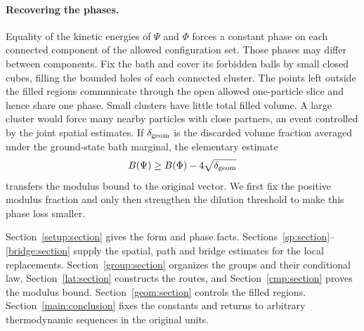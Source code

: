 \paragraph{Recovering the phases.}
Equality of the kinetic energies of $\Psi$ and $\Phi$ forces a constant
phase on each connected component of the allowed configuration set.
Those phases may differ between components. Fix the bath and cover its
forbidden balls by small closed cubes, filling the bounded holes of each
connected cluster. The points left outside the filled regions communicate
through the open allowed one-particle slice and hence share one phase.
Small clusters have little total filled volume. A large cluster would
force many nearby particles with close partners, an event controlled by
the joint spatial estimates. If $\delta_{\rm geom}$ is the discarded
volume fraction averaged under the ground-state bath marginal, the
elementary estimate
\[
 B(\Psi)\ge B(\Phi)-4\sqrt{\delta_{\rm geom}}
\]
transfers the modulus bound to the original vector. We first fix the
positive modulus fraction and only then strengthen the dilution threshold
to make this phase loss smaller.

Section~\ref{setup:section} gives the form and phase facts.
Sections~\ref{sp:section}--\ref{bridge:section} supply the spatial, path
and bridge estimates for the local replacements.
Section~\ref{group:section} organizes the groups and their conditional law,
Section~\ref{lat:section} constructs the routes, and
Section~\ref{cmp:section} proves the modulus bound.
Section~\ref{geom:section} controls the filled regions.
Section~\ref{main:conclusion} fixes the constants and returns to arbitrary
thermodynamic sequences in the original units.
